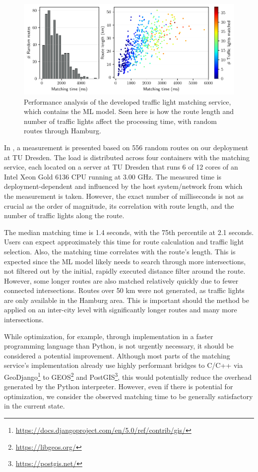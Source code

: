 \begin{figure}[t]
\centering 
\includegraphics[width=\linewidth]{images/matching-performance-556-routes.pdf}
\caption{Performance analysis of the developed traffic light matching service, which contains the ML model. Seen here is how the route length and number of traffic lights affect the processing time, with random routes through Hamburg.}
\label{fig:matching-performance}
\end{figure}

In , a measurement is presented based on 556 random routes on our deployment at TU Dresden. The load is distributed across four containers with the matching service, each located on a server at TU Dresden that runs 6 of 12 cores of an Intel Xeon Gold 6136 CPU running at 3.00 GHz. The measured time is deployment-dependent and influenced by the host system/network from which the measurement is taken. However, the exact number of milliseconds is not as crucial as the order of magnitude, its correlation with route length, and the number of traffic lights along the route.

The median matching time is 1.4 seconds, with the 75th percentile at 2.1 seconds. Users can expect approximately this time for route calculation and traffic light selection. Also, the matching time correlates with the route's length. This is expected since the ML model likely needs to search through more intersections, not filtered out by the initial, rapidly executed distance filter around the route. However, some longer routes are also matched relatively quickly due to fewer connected intersections. Routes over 50 km were not generated, as traffic lights are only available in the Hamburg area. This is important should the method be applied on an inter-city level with significantly longer routes and many more intersections.

While optimization, for example, through implementation in a faster programming language than Python, is not urgently necessary, it should be considered a potential improvement. Although most parts of the matching service's implementation already use highly performant bridges to C/C++ via GeoDjango\footnote{\url{https://docs.djangoproject.com/en/5.0/ref/contrib/gis/}} to GEOS\footnote{\url{https://libgeos.org/}} and PostGIS\footnote{\url{https://postgis.net/}}, this would potentially reduce the overhead generated by the Python interpreter. However, even if there is potential for optimization, we consider the observed matching time to be generally satisfactory in the current state. 

